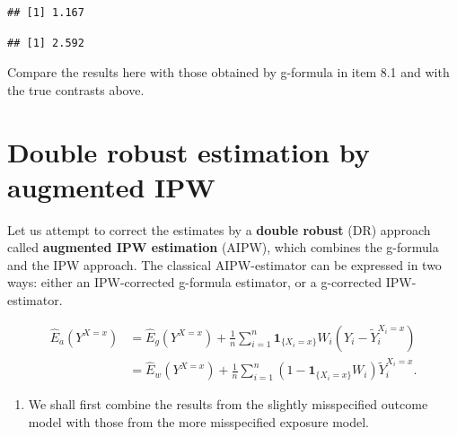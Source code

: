 \documentclass[
]{book}
\newenvironment{Shaded}{\begin{snugshade}}{\end{snugshade}}
\newcommand{\AttributeTok}[1]{\textcolor[rgb]{0.13,0.29,0.53}{#1}}
\newcommand{\DecValTok}[1]{\textcolor[rgb]{0.00,0.00,0.81}{#1}}
\newcommand{\FunctionTok}[1]{\textcolor[rgb]{0.13,0.29,0.53}{\textbf{#1}}}
\newcommand{\NormalTok}[1]{#1}
\newcommand{\SpecialCharTok}[1]{\textcolor[rgb]{0.81,0.36,0.00}{\textbf{#1}}}
\newcommand{\StringTok}[1]{\textcolor[rgb]{0.31,0.60,0.02}{#1}}
\providecommand{\tightlist}{%
  \setlength{\itemsep}{0pt}\setlength{\parskip}{0pt}}
\begin{document}
\begin{verbatim}
## [1] 1.167
\end{verbatim}

\begin{Shaded}
\end{Shaded}

\begin{verbatim}
## [1] 2.592
\end{verbatim}

Compare the results here with those obtained by
g-formula in item 8.1
and with the true contrasts above.

\section{Double robust estimation by augmented IPW}\label{double-robust-estimation-by-augmented-ipw}

Let us attempt to correct the estimates by a \textbf{double
robust} (DR) approach
called \textbf{augmented IPW estimation} (AIPW), which
combines the g-formula and
the IPW approach. The classical
AIPW-estimator can be expressed in two ways:
either an IPW-corrected g-formula estimator, or a g-corrected
IPW-estimator.

\[
\begin{aligned}
 \widehat{E}_a(Y^{X=x}) 
       & = \widehat{E}_g(Y^{X=x}) +
\frac{1}{n} \sum_{i=1}^n  {\mathbf 1}_{\{X_i=x\}} W_i 
                   ( Y_i - \widetilde{Y}_i^{X_i=x} )   \\
       & = \widehat{E}_w(Y^{X=x}) +
\frac{1}{n} \sum_{i=1}^n ( 1 - {\mathbf 1}_{\{X_i=x\}} W_i ) 
                      \widetilde{Y}_i^{X_i=x}.
\end{aligned}
\]

\begin{enumerate}
\def\labelenumi{\arabic{enumi}.}
\tightlist
\item
  We shall first combine the results from the slightly
  misspecified outcome model with those from the more
  misspecified exposure model.
\end{enumerate}
\end{document}
